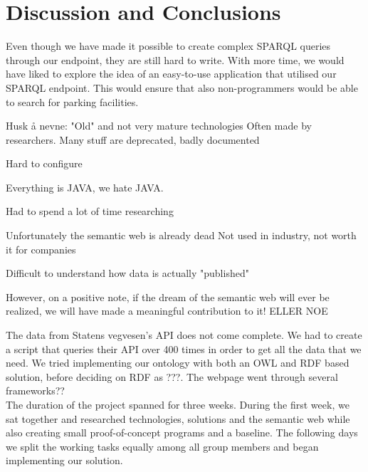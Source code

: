 \chapter{Discussion and Conclusions}

Even though we have made it possible to create complex SPARQL queries through our endpoint, they are still hard to write. With more time, we would have liked to explore the idea of an easy-to-use application that utilised our SPARQL endpoint. This would ensure that also non-programmers would be able to search for parking facilities.


Husk å nevne:
	"Old" and not very mature technologies
	Often made by researchers. Many stuff are deprecated, badly documented

	Hard to configure

	Everything is JAVA, we hate JAVA.

	Had to spend a lot of time researching

	Unfortunately the semantic web is already dead
	Not used in industry, not worth it for companies

	Difficult to understand how data is actually "published"


	However, on a positive note, if the dream of the semantic web will ever be realized, we will have made a meaningful contribution to it! ELLER NOE



The data from Statens vegvesen's API \cite{statensvegvesen} does not come complete. We had to create a script that queries their API over 400 times in order to get all the data that we need. We tried implementing our ontology with both an OWL and RDF based solution, before deciding on RDF as ???. The webpage went through several frameworks??\\

The duration of the project spanned for three weeks. During the first week, we sat together and researched technologies, solutions and the semantic web while also creating small proof-of-concept programs and a baseline. The following days we split the working tasks equally among all group members and began implementing our solution.
